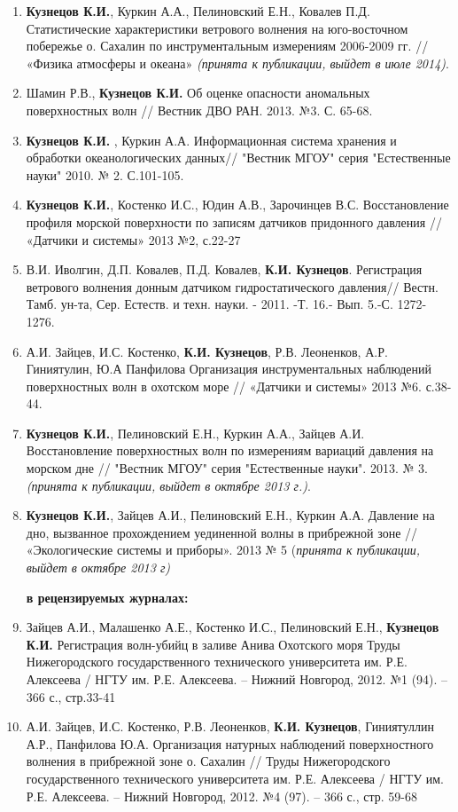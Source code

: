 \begin{enumerate}
  \item \textbf{Кузнецов К.И.}, Куркин А.А., Пелиновский Е.Н., Ковалев П.Д. Статистические характеристики ветрового волнения на юго-восточном побережье о. Сахалин по инструментальным измерениям 2006-2009 гг. // «Физика атмосферы и океана» \emph{(принята к публикации, выйдет в июле 2014)}.
  \item Шамин Р.В., \textbf{Кузнецов К.И.} Об оценке опасности аномальных поверхностных волн // Вестник ДВО РАН. 2013. №3. С. 65-68.
  \item \textbf{Кузнецов К.И.} , Куркин А.А. Информационная система хранения и обработки океанологических данных// "Вестник МГОУ" серия "Естественные науки" 2010. № 2.  С.101-105.
  \item \textbf{Кузнецов К.И.}, Костенко И.С., Юдин А.В., Зарочинцев В.С. Восстановление профиля морской поверхности по записям датчиков придонного давления  // «Датчики и системы» 2013 №2, с.22-27
  \item В.И. Иволгин, Д.П. Ковалев, П.Д. Ковалев, \textbf{К.И. Кузнецов}. Регистрация ветрового волнения донным датчиком гидростатического давления// Вестн. Тамб. ун-та, Сер. Естеств. и техн. науки. - 2011. -Т. 16.- Вып. 5.-С. 1272-1276.
  \item А.И. Зайцев, И.С. Костенко, \textbf{К.И. Кузнецов}, Р.В. Леоненков, А.Р. Гиниятулин,  Ю.А  Панфилова  Организация инструментальных наблюдений поверхностных волн в охотском море // «Датчики и системы» 2013 №6. с.38-44.
  \item \textbf{Кузнецов К.И.}, Пелиновский Е.Н., Куркин А.А., Зайцев А.И. Восстановление поверхностных волн по измерениям  вариаций давления на морском дне // "Вестник МГОУ" серия "Естественные науки". 2013. № 3.  \emph{(принята к публикации, выйдет в октябре 2013 г.)}.
  \item \textbf{Кузнецов К.И.}, Зайцев А.И., Пелиновский Е.Н., Куркин А.А. Давление на дно, вызванное прохождением уединенной волны в прибрежной зоне // «Экологические системы и приборы». 2013 № 5 (\emph{принята к публикации, выйдет в октябре 2013 г)}

\textbf{в рецензируемых журналах:}

  \item Зайцев А.И., Малашенко А.Е., Костенко И.С., Пелиновский Е.Н., \textbf{Кузнецов К.И.} Регистрация волн-убийц в заливе Анива Охотского моря  Труды Нижегородского государственного технического университета им. Р.Е. Алексеева / НГТУ им.  Р.Е. Алексеева. – Нижний Новгород, 2012. №1 (94). – 366 с., стр.33-41
  \item А.И. Зайцев, И.С. Костенко, Р.В. Леоненков, \textbf{К.И. Кузнецов}, Гиниятуллин А.Р., Панфилова Ю.А. Организация натурных наблюдений поверхностного волнения в прибрежной зоне о. Сахалин // Труды Нижегородского государственного технического университета им. Р.Е. Алексеева / НГТУ им.  Р.Е. Алексеева. – Нижний Новгород, 2012. №4 (97). – 366 с., стр. 59-68

\end{enumerate}

